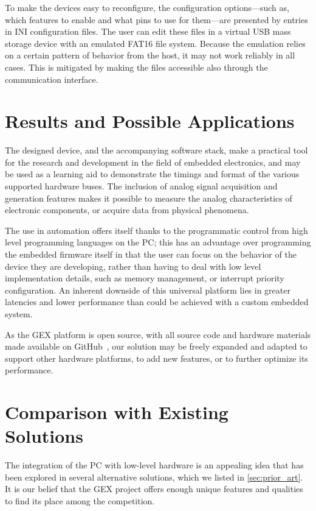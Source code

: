 To make the devices easy to reconfigure, the configuration options---such as, which features to enable and what pins to use for them---are presented by entries in INI configuration files. The user can edit these files in a virtual \gls{USB} mass storage device with an emulated FAT16 file system. Because the emulation relies on a certain pattern of behavior from the host, it may not work reliably in all cases. This is mitigated by making the files accessible also through the communication interface.

\section{Results and Possible Applications}

The designed device, and the accompanying software stack, make a practical tool for the research and development in the field of embedded electronics, and may be used as a learning aid to demonstrate the timings and format of the various supported hardware buses. The inclusion of analog signal acquisition and generation features makes it possible to measure the analog characteristics of electronic components, or acquire data from physical phenomena. 

The use in automation offers itself thanks to the programmatic control from high level programming languages on the \gls{PC}; this has an advantage over programming the embedded firmware itself in that the user can focus on the behavior of the device they are developing, rather than having to deal with low level implementation details, such as memory management, or interrupt priority configuration. An inherent downside of this universal platform lies in greater latencies and lower performance than could be achieved with a custom embedded system.

As the GEX platform is open source, with all source code and hardware materials made available on GitHub~\cite{gex-gh}, our solution may be freely expanded and adapted to support other hardware platforms, to add new features, or to further optimize its performance.

\section{Comparison with Existing Solutions}

The integration of the \gls{PC} with low-level hardware is an appealing idea that has been explored in several alternative solutions, which we listed in \cref{sec:prior_art}. It is our belief that the GEX project offers enough unique features and qualities to find its place among the competition.


